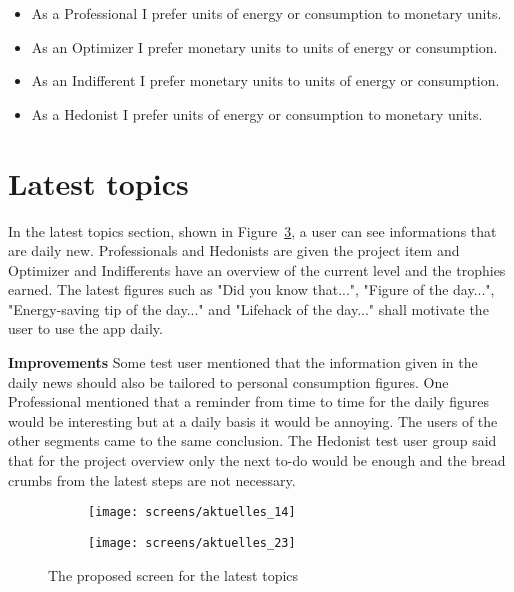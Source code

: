 \begin{itemize}
	\item As a Professional I prefer units of energy or consumption to monetary units.
	\item As an Optimizer I prefer monetary units to units of energy or consumption.
	\item As an Indifferent I prefer monetary units to units of energy or consumption.
	\item As a Hedonist I prefer units of energy or consumption to monetary units.
\end{itemize}

\section{Latest topics}

In the latest topics section, shown in Figure~\ref{fig:aktuelles}, a user can see informations that are daily new. Professionals and Hedonists are given the project item and Optimizer and Indifferents have an overview of the current level and the trophies earned. The latest figures such as "Did you know that...", "Figure of the day...", "Energy-saving tip of the day..." and "Lifehack of the day..." shall motivate the user to use the app daily.

\textbf{Improvements} \quad Some test user mentioned that the information given in the daily news should also be tailored to personal consumption figures. One Professional mentioned that a reminder from time to time for the daily figures would be interesting but at a daily basis it would be annoying. The users of the other segments came to the same conclusion. The Hedonist test user group said that for the project overview only the next to-do would be enough and the bread crumbs from the latest steps are not necessary.

\begin{figure}[h]
	\centering
	\begin{subfigure}[b]{0.24\columnwidth}
		\centering
		\texttt{[image: screens/aktuelles\_14]}
		\label{fig:aktuelles:professional}
	\end{subfigure}
	\begin{subfigure}[b]{0.24\columnwidth}
		\centering
		\texttt{[image: screens/aktuelles\_23]}
		\label{fig:aktuelles:optimizer}
	\end{subfigure}
	\caption{The proposed screen for the latest topics}
	\label{fig:aktuelles} %
\end{figure}

